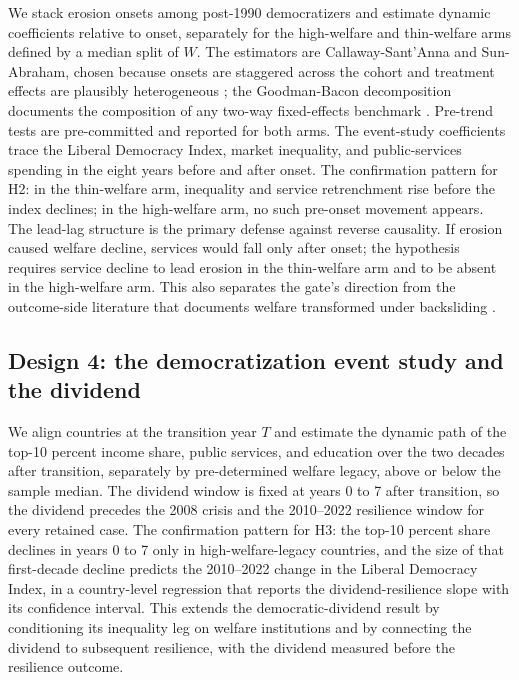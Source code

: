 We stack erosion onsets among post-1990 democratizers and estimate dynamic coefficients relative to onset, separately for the high-welfare and thin-welfare arms defined by a median split of $W$. The estimators are Callaway-Sant'Anna and Sun-Abraham, chosen because onsets are staggered across the cohort and treatment effects are plausibly heterogeneous \citep{Callaway2021, SunAbraham2021}; the Goodman-Bacon decomposition documents the composition of any two-way fixed-effects benchmark \citep{GoodmanBacon2021}. Pre-trend tests are pre-committed and reported for both arms. The event-study coefficients trace the Liberal Democracy Index, market inequality, and public-services spending in the eight years before and after onset. The confirmation pattern for H2: in the thin-welfare arm, inequality and service retrenchment rise before the index declines; in the high-welfare arm, no such pre-onset movement appears. The lead-lag structure is the primary defense against reverse causality. If erosion caused welfare decline, services would fall only after onset; the hypothesis requires service decline to lead erosion in the thin-welfare arm and to be absent in the high-welfare arm. This also separates the gate's direction from the outcome-side literature that documents welfare transformed under backsliding \citep{SzikraOktem2023, LendvaiBainton2021, Vanhuysse2006, Benczes2024}.

\subsection{Design 4: the democratization event study and the dividend}

We align countries at the transition year $T$ and estimate the dynamic path of the top-10 percent income share, public services, and education over the two decades after transition, separately by pre-determined welfare legacy, above or below the sample median. The dividend window is fixed at years 0 to 7 after transition, so the dividend precedes the 2008 crisis and the 2010--2022 resilience window for every retained case. The confirmation pattern for H3: the top-10 percent share declines in years 0 to 7 only in high-welfare-legacy countries, and the size of that first-decade decline predicts the 2010--2022 change in the Liberal Democracy Index, in a country-level regression that reports the dividend-resilience slope with its confidence interval. This extends the democratic-dividend result \citep{AcemogluNaidu2015} by conditioning its inequality leg on welfare institutions and by connecting the dividend to subsequent resilience, with the dividend measured before the resilience outcome.

